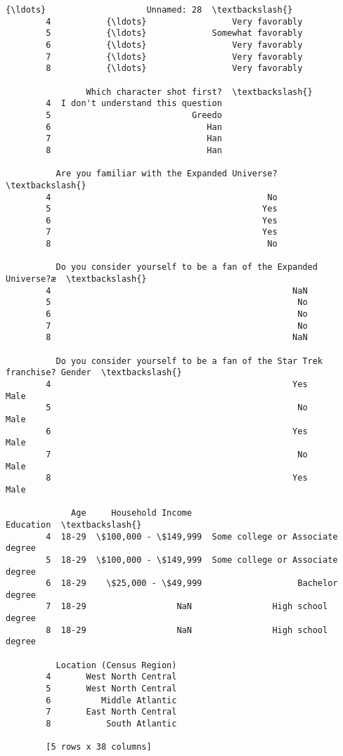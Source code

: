 \documentclass[11pt]{article}
\begin{document}
\begin{Verbatim}[commandchars=\\\{\}]
                    {\ldots}                    Unnamed: 28  \textbackslash{}
        4           {\ldots}                 Very favorably   
        5           {\ldots}             Somewhat favorably   
        6           {\ldots}                 Very favorably   
        7           {\ldots}                 Very favorably   
        8           {\ldots}                 Very favorably   
        
                Which character shot first?  \textbackslash{}
        4  I don't understand this question   
        5                            Greedo   
        6                               Han   
        7                               Han   
        8                               Han   
        
          Are you familiar with the Expanded Universe?  \textbackslash{}
        4                                           No   
        5                                          Yes   
        6                                          Yes   
        7                                          Yes   
        8                                           No   
        
          Do you consider yourself to be a fan of the Expanded Universe?æ  \textbackslash{}
        4                                                NaN                 
        5                                                 No                 
        6                                                 No                 
        7                                                 No                 
        8                                                NaN                 
        
          Do you consider yourself to be a fan of the Star Trek franchise? Gender  \textbackslash{}
        4                                                Yes                 Male   
        5                                                 No                 Male   
        6                                                Yes                 Male   
        7                                                 No                 Male   
        8                                                Yes                 Male   
        
             Age     Household Income                         Education  \textbackslash{}
        4  18-29  \$100,000 - \$149,999  Some college or Associate degree   
        5  18-29  \$100,000 - \$149,999  Some college or Associate degree   
        6  18-29    \$25,000 - \$49,999                   Bachelor degree   
        7  18-29                  NaN                High school degree   
        8  18-29                  NaN                High school degree   
        
          Location (Census Region)  
        4       West North Central  
        5       West North Central  
        6          Middle Atlantic  
        7       East North Central  
        8           South Atlantic  
        
        [5 rows x 38 columns]
\end{Verbatim}
            
\end{document}
